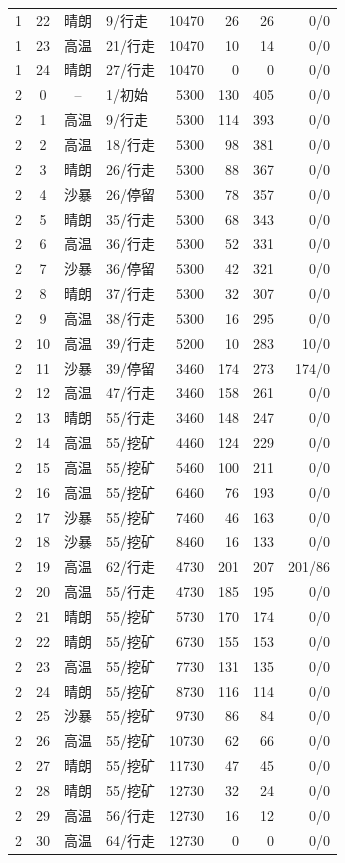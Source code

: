 \begin{longtable}{ccclrrrr}
1 & 22 & 晴朗 & 9/行走 & 10470 & 26 & 26 & 0/0\\
1 & 23 & 高温 & 21/行走 & 10470 & 10 & 14 & 0/0\\
1 & 24 & 晴朗 & 27/行走 & 10470 & 0 & 0 & 0/0\\
2 & 0 & -- & 1/初始 & 5300 & 130 & 405 & 0/0\\
2 & 1 & 高温 & 9/行走 & 5300 & 114 & 393 & 0/0\\
2 & 2 & 高温 & 18/行走 & 5300 & 98 & 381 & 0/0\\
2 & 3 & 晴朗 & 26/行走 & 5300 & 88 & 367 & 0/0\\
2 & 4 & 沙暴 & 26/停留 & 5300 & 78 & 357 & 0/0\\
2 & 5 & 晴朗 & 35/行走 & 5300 & 68 & 343 & 0/0\\
2 & 6 & 高温 & 36/行走 & 5300 & 52 & 331 & 0/0\\
2 & 7 & 沙暴 & 36/停留 & 5300 & 42 & 321 & 0/0\\
2 & 8 & 晴朗 & 37/行走 & 5300 & 32 & 307 & 0/0\\
2 & 9 & 高温 & 38/行走 & 5300 & 16 & 295 & 0/0\\
2 & 10 & 高温 & 39/行走 & 5200 & 10 & 283 & 10/0\\
2 & 11 & 沙暴 & 39/停留 & 3460 & 174 & 273 & 174/0\\
2 & 12 & 高温 & 47/行走 & 3460 & 158 & 261 & 0/0\\
2 & 13 & 晴朗 & 55/行走 & 3460 & 148 & 247 & 0/0\\
2 & 14 & 高温 & 55/挖矿 & 4460 & 124 & 229 & 0/0\\
2 & 15 & 高温 & 55/挖矿 & 5460 & 100 & 211 & 0/0\\
2 & 16 & 高温 & 55/挖矿 & 6460 & 76 & 193 & 0/0\\
2 & 17 & 沙暴 & 55/挖矿 & 7460 & 46 & 163 & 0/0\\
2 & 18 & 沙暴 & 55/挖矿 & 8460 & 16 & 133 & 0/0\\
2 & 19 & 高温 & 62/行走 & 4730 & 201 & 207 & 201/86\\
2 & 20 & 高温 & 55/行走 & 4730 & 185 & 195 & 0/0\\
2 & 21 & 晴朗 & 55/挖矿 & 5730 & 170 & 174 & 0/0\\
2 & 22 & 晴朗 & 55/挖矿 & 6730 & 155 & 153 & 0/0\\
2 & 23 & 高温 & 55/挖矿 & 7730 & 131 & 135 & 0/0\\
2 & 24 & 晴朗 & 55/挖矿 & 8730 & 116 & 114 & 0/0\\
2 & 25 & 沙暴 & 55/挖矿 & 9730 & 86 & 84 & 0/0\\
2 & 26 & 高温 & 55/挖矿 & 10730 & 62 & 66 & 0/0\\
2 & 27 & 晴朗 & 55/挖矿 & 11730 & 47 & 45 & 0/0\\
2 & 28 & 晴朗 & 55/挖矿 & 12730 & 32 & 24 & 0/0\\
2 & 29 & 高温 & 56/行走 & 12730 & 16 & 12 & 0/0\\
2 & 30 & 高温 & 64/行走 & 12730 & 0 & 0 & 0/0\\
\end{longtable}
